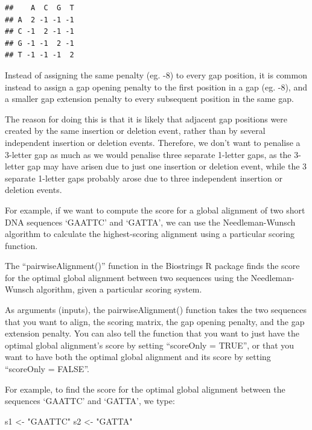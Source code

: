 \documentclass[
]{book}
\newenvironment{Shaded}{\begin{snugshade}}{\end{snugshade}}
\newcommand{\NormalTok}[1]{#1}
\newcommand{\OtherTok}[1]{\textcolor[rgb]{0.56,0.35,0.01}{#1}}
\newcommand{\StringTok}[1]{\textcolor[rgb]{0.31,0.60,0.02}{#1}}
\begin{document}
\begin{verbatim}
##    A  C  G  T
## A  2 -1 -1 -1
## C -1  2 -1 -1
## G -1 -1  2 -1
## T -1 -1 -1  2
\end{verbatim}

Instead of assigning the same penalty (eg. -8) to every gap position, it is common instead to assign a gap opening penalty to the first position in a gap (eg. -8), and a smaller gap extension penalty to every subsequent position in the same gap.

The reason for doing this is that it is likely that adjacent gap positions were created by the same insertion or deletion event, rather than by several independent insertion or deletion events. Therefore, we don't want to penalise a 3-letter gap as much as we would penalise three separate 1-letter gaps, as the 3-letter gap may have arisen due to just one insertion or deletion event, while the 3 separate 1-letter gaps probably arose due to three independent insertion or deletion events.

For example, if we want to compute the score for a global alignment of two short DNA sequences `GAATTC' and `GATTA', we can use the Needleman-Wunsch algorithm to calculate the highest-scoring alignment using a particular scoring function.

The ``pairwiseAlignment()'' function in the Biostrings R package finds the score for the optimal global alignment between two sequences using the Needleman-Wunsch algorithm, given a particular scoring system.

As arguments (inputs), the pairwiseAlignment() function takes the two sequences that you want to align, the scoring matrix, the gap opening penalty, and the gap extension penalty. You can also tell the function that you want to just have the optimal global alignment's score by setting ``scoreOnly = TRUE'', or that you want to have both the optimal global alignment and its score by setting ``scoreOnly = FALSE''.

For example, to find the score for the optimal global alignment between the sequences `GAATTC' and `GATTA', we type:

\begin{Shaded}
\begin{Highlighting}[]
\NormalTok{s1 }\OtherTok{\textless{}{-}} \StringTok{"GAATTC"}
\NormalTok{s2 }\OtherTok{\textless{}{-}} \StringTok{"GATTA"}
\end{Highlighting}
\end{Shaded}
\end{document}
